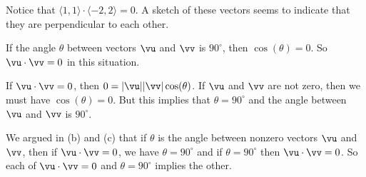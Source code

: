 \begin{activitySolution}
\ba
\item Notice that $\langle 1,1 \rangle \cdot \langle -2, 2 \rangle = 0$. A sketch of these vectors seems to indicate that they are perpendicular to each other. 
\item If the angle $\theta$ between vectors $\vu$ and $\vv$ is $90^{\circ}$, then $\cos(\theta) = 0$. So $\vu \cdot \vv = 0$ in this situation.  
\item If $\vu \cdot \vv = 0$, then $0 = |\vu| |\vv| \cos(\theta)$. If $\vu$ and $\vv$ are not zero, then we must have $\cos(\theta) = 0$. But this implies that $\theta = 90^{\circ}$ and the angle between $\vu$ and $\vv$ is $90^{\circ}$.
\item We argued in (b) and (c) that if $\theta$ is the angle between nonzero vectors $\vu$ and $\vv$, then if $\vu \cdot \vv = 0$, we have $\theta = 90^{\circ}$ and if $\theta = 90^{\circ}$ then $\vu \cdot \vv = 0$. So each of $\vu \cdot \vv = 0$ and $\theta = 90^{\circ}$ implies the other. 
\ea
\end{activitySolution}
\aftera
